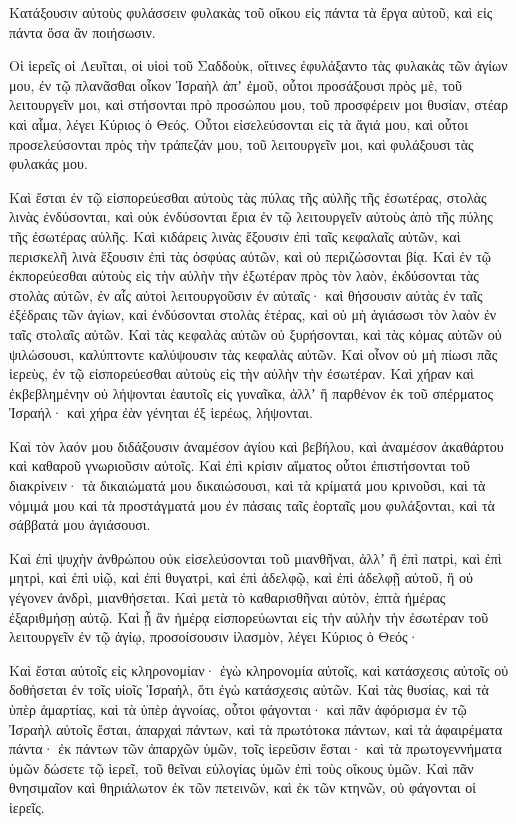 {Κατάξουσιν αὐτοὺς φυλάσσειν φυλακὰς τοῦ οἴκου εἰς πάντα τὰ ἔργα αὐτοῦ, καὶ εἰς πάντα ὅσα ἂν ποιήσωσιν.
\par }{\PP {}Οἱ ἱερεῖς οἱ Λευῖται, οἱ υἱοὶ τοῦ Σαδδοὺκ, οἵτινες ἐφυλάξαντο τὰς φυλακὰς τῶν ἁγίων μου, ἐν τῷ πλανᾶσθαι οἶκον Ἰσραὴλ ἀπʼ ἐμοῦ, οὗτοι προσάξουσι πρὸς μὲ, τοῦ λειτουργεῖν μοι, καὶ στήσονται πρὸ προσώπου μου, τοῦ προσφέρειν μοι θυσίαν, στέαρ καὶ αἷμα, λέγει Κύριος ὁ Θεός.
Οὗτοι εἰσελεύσονται εἰς τὰ ἅγιά μου, καὶ οὗτοι προσελεύσονται πρὸς τὴν τράπεζάν μου, τοῦ λειτουργεῖν μοι, καὶ φυλάξουσι τὰς φυλακάς μου.
\par }{\PP {}Καὶ ἔσται ἐν τῷ εἰσπορεύεσθαι αὐτοὺς τὰς πύλας τῆς αὐλῆς τῆς ἐσωτέρας, στολὰς λινὰς ἐνδύσονται, καὶ οὐκ ἐνδύσονται ἔρια ἐν τῷ λειτουργεῖν αὐτοὺς ἀπὸ τῆς πύλης τῆς ἐσωτέρας αὐλῆς.
Καὶ κιδάρεις λινὰς ἕξουσιν ἐπὶ ταῖς κεφαλαῖς αὐτῶν, καὶ περισκελῆ λινὰ ἕξουσιν ἐπὶ τὰς ὀσφύας αὐτῶν, καὶ οὐ περιζώσονται βίᾳ.
Καὶ ἐν τῷ ἐκπορεύεσθαι αὐτοὺς εἰς τὴν αὐλὴν τὴν ἐξωτέραν πρὸς τὸν λαὸν, ἐκδύσονται τὰς στολὰς αὐτῶν, ἐν αἷς αὐτοὶ λειτουργοῦσιν ἐν αὐταῖς· καὶ θήσουσιν αὐτὰς ἐν ταῖς ἐξέδραις τῶν ἁγίων, καὶ ἐνδύσονται στολὰς ἑτέρας, καὶ οὐ μὴ ἁγιάσωσι τὸν λαὸν ἐν ταῖς στολαῖς αὐτῶν.
Καὶ τὰς κεφαλὰς αὐτῶν οὐ ξυρήσονται, καὶ τὰς κόμας αὐτῶν οὐ ψιλώσουσι, καλύπτοντε καλύψουσιν τὰς κεφαλὰς αὐτῶν.
Καὶ οἶνον οὐ μὴ πίωσι πᾶς ἱερεὺς, ἐν τῷ εἰσπορεύεσθαι αὐτοὺς εἰς τὴν αὐλὴν τὴν ἐσωτέραν.
Καὶ χήραν καὶ ἐκβεβλημένην οὐ λήψονται ἑαυτοῖς εἰς γυναῖκα, ἀλλʼ ἢ παρθένον ἐκ τοῦ σπέρματος Ἰσραήλ· καὶ χήρα ἐὰν γένηται ἐξ ἱερέως, λήψονται.
\par }{\PP {}Καὶ τὸν λαόν μου διδάξουσιν ἀναμέσον ἁγίου καὶ βεβήλου, καὶ ἀναμέσον ἀκαθάρτου καὶ καθαροῦ γνωριοῦσιν αὐτοῖς.
Καὶ ἐπὶ κρίσιν αἵματος οὗτοι ἐπιστήσονται τοῦ διακρίνειν· τὰ δικαιώματά μου δικαιώσουσι, καὶ τὰ κρίματά μου κρινοῦσι, καὶ τὰ νόμιμά μου καὶ τὰ προστάγματά μου ἐν πάσαις ταῖς ἑορταῖς μου φυλάξονται, καὶ τὰ σάββατά μου ἁγιάσουσι.
\par }{\PP {}Καὶ ἐπὶ ψυχὴν ἀνθρώπου οὐκ εἰσελεύσονται τοῦ μιανθῆναι, ἀλλʼ ἢ ἐπὶ πατρὶ, καὶ ἐπὶ μητρὶ, καὶ ἐπὶ υἱῷ, καὶ ἐπὶ θυγατρὶ, καὶ ἐπὶ ἀδελφῷ, καὶ ἐπὶ ἀδελφῇ αὐτοῦ, ἣ οὐ γέγονεν ἀνδρὶ, μιανθήσεται.
Καὶ μετὰ τὸ καθαρισθῆναι αὐτὸν, ἑπτὰ ἡμέρας ἐξαριθμήσῃ αὐτῷ.
Καὶ ᾗ ἂν ἡμέρᾳ εἰσπορεύωνται εἰς τὴν αὐλὴν τὴν ἐσωτέραν τοῦ λειτουργεῖν ἐν τῷ ἁγίῳ, προσοίσουσιν ἱλασμὸν, λέγει Κύριος ὁ Θεός·
\par }{\PP {}Καὶ ἔσται αὐτοῖς εἰς κληρονομίαν· ἐγὼ κληρονομία αὐτοῖς, καὶ κατάσχεσις αὐτοῖς οὐ δοθήσεται ἐν τοῖς υἱοῖς Ἰσραὴλ, ὅτι ἐγὼ κατάσχεσις αὐτῶν.
Καὶ τὰς θυσίας, καὶ τὰ ὑπὲρ ἁμαρτίας, καὶ τὰ ὑπὲρ ἀγνοίας, οὗτοι φάγονται· καὶ πᾶν ἀφόρισμα ἐν τῷ Ἰσραὴλ αὐτοῖς ἔσται,
ἀπαρχαὶ πάντων, καὶ τὰ πρωτότοκα πάντων, καὶ τὰ ἀφαιρέματα πάντα· ἐκ πάντων τῶν ἀπαρχῶν ὑμῶν, τοῖς ἱερεῦσιν ἔσται· καὶ τὰ πρωτογεννήματα ὑμῶν δώσετε τῷ ἱερεῖ, τοῦ θεῖναι εὐλογίας ὑμῶν ἐπὶ τοὺς οἴκους ὑμῶν.
Καὶ πᾶν θνησιμαῖον καὶ θηριάλωτον ἐκ τῶν πετεινῶν, καὶ ἐκ τῶν κτηνῶν, οὐ φάγονται οἱ ἱερεῖς.

}
